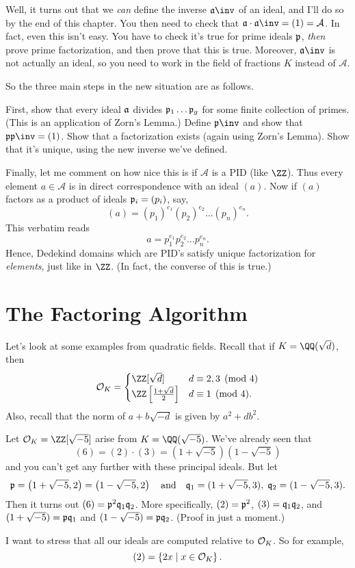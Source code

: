 Well, it turns out that we \emph{can} define the inverse $\aa\inv$ of an ideal,
and I'll do so by the end of this chapter.
You then need to check that $\aa \cdot \aa\inv = (1) = \mathcal A$.
In fact, even this isn't easy.
You have to check it's true for prime ideals $\pp$,
\emph{then} prove prime factorization,
and then prove that this is true.
Moreover, $\aa\inv$ is not actually an ideal, so you need to
work in the field of fractions $K$ instead of $\mathcal A$.

So the three main steps in the new situation are as follows.
\begin{enumerate}[(1)]
	\ii First, show that every ideal $\aa$ divides $\pp_1 \dots \pp_g$ for some finite collection of primes.
	(This is an application of Zorn's Lemma.)
	\ii Define $\pp\inv$ and show that $\pp \pp\inv = (1)$.
	\ii Show that a factorization exists (again using Zorn's Lemma).
	\ii Show that it's unique, using the new inverse we've defined.
\end{enumerate}

Finally, let me comment on how nice this is if $\mathcal A$ is a PID (like $\ZZ$).
Thus every element $a \in \mathcal A$ is in direct correspondence with an ideal $(a)$.
Now if $(a)$ factors as a product of ideals $\pp_i = (p_i)$, say,
\[ (a) = (p_1)^{e_1} (p_2)^{e_2} \dots (p_n)^{e_n} . \]
This verbatim reads \[ a = p_1^{e_1} p_2^{e_2} \dots p_n^{e_n}. \]
Hence, Dedekind domains which are PID's satisfy unique factorization for \emph{elements},
just like in $\ZZ$. (In fact, the converse of this is true.)

\section{The Factoring Algorithm}
Let's look at some examples from quadratic fields.
Recall that if $K = \QQ(\sqrt{d})$, then
\[
	\OO_K =
	\begin{cases}
		\ZZ[\sqrt d] & d \equiv 2,3 \pmod 4 \\
		\ZZ\left[ \frac{1+\sqrt d}{2} \right] & d \equiv 1 \pmod 4.
	\end{cases}
\]
Also, recall that the norm of $a+b\sqrt{-d}$ is given by $a^2+db^2$.


\begin{example}
	Let $\OO_K = \ZZ[\sqrt{-5}]$ arise from $K = \QQ(\sqrt{-5})$.
	We've already seen that
	\[ (6) = (2) \cdot (3) = \left( 1+\sqrt{-5} \right)\left( 1-\sqrt{-5} \right) \]
	and you can't get any further with these principal ideals.
	But let
	\[ \pp = \left( 1+\sqrt{-5}, 2 \right) = \left( 1-\sqrt{-5}, 2 \right)
		\quad\text{and}\quad \qq_1 = (1+\sqrt{-5},3),
		\; \qq_2 = (1-\sqrt{-5},3). \]
	Then it turns out $(6) = \pp^2\qq_1\qq_2$.
	More specifically, $(2) = \pp^2$, $(3) = \qq_1\qq_2$,
	and $(1+\sqrt{-5}) = \pp\qq_1$ and $(1-\sqrt{-5}) = \pp\qq_2$.
	(Proof in just a moment.)
\end{example}
I want to stress that all our ideals are computed relative to $\OO_K$.
So for example, \[ (2) = \left\{ 2x \mid x \in \OO_K \right\}. \]

